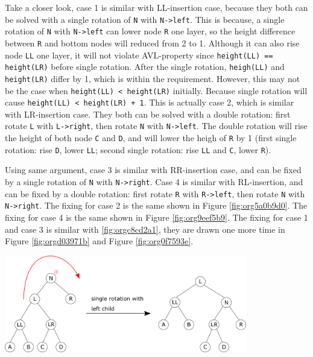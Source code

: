 \documentclass[12pt]{book}
\begin{document}
Take a closer look, case 1 is similar with LL-insertion case, because they both can be solved with a single rotation of \texttt{N} with \texttt{N->left}. This is because, a single rotation of \texttt{N} with \texttt{N->left} can lower node \texttt{R} one layer, so the height difference between \texttt{R} and bottom nodes will reduced from 2 to 1. Although it can also rise node \texttt{LL} one layer, it will not violate AVL-property since \texttt{height(LL) == height(LR)} before single rotation. After the single rotation, \texttt{heigh(LL)} and \texttt{height(LR)} differ by 1, which is within the requirement. However, this may not be the case when \texttt{height(LL) < height(LR)} initially. Because single rotation will cause \texttt{height(LL) < height(LR) + 1}. This is actually case 2, which is similar with LR-insertion case. They both can be solved with a double rotation: first rotate \texttt{L} with \texttt{L->right}, then rotate \texttt{N} with \texttt{N->left}. The double rotation will rise the height of both node \texttt{C} and \texttt{D}, and will lower the heigh of \texttt{R} by 1 (first single rotation: rise \texttt{D}, lower \texttt{LL}; second single rotation: rise \texttt{LL} and \texttt{C}, lower \texttt{R}).

Using same argument, case 3 is similar with RR-insertion case, and can be fixed by a single rotation of \texttt{N} with \texttt{N->right}. Case 4 is similar with RL-insertion, and can be fixed by a double rotation: first rotate \texttt{R} with \texttt{R->left}, then rotate \texttt{N} with \texttt{N->right}. The fixing for case 2 is the same shown in Figure \ref{fig:org5a0b9d0}. The fixing for case 4 is the same shown in Figure \ref{fig:org9eef5b9}. The fixing for case 1 and case 3 is similar with \ref{fig:orgc8cd2a1}, they are drawn one more time in Figure \ref{fig:orgd03971b} and Figure \ref{fig:org0f7593e}.

\begin{center}
\includegraphics[width=400px]{./img/AVL-deletion-LL-fix.pdf}
\end{center}
\end{document}
